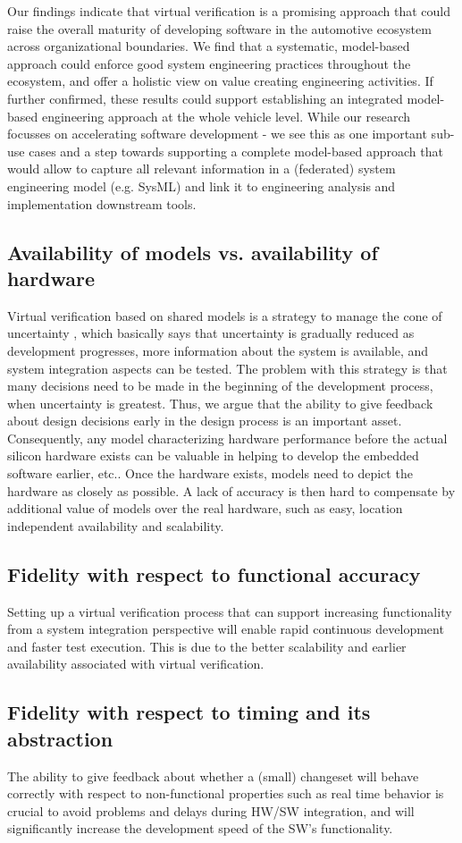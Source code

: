Our findings indicate that virtual verification is a promising approach that could raise the overall maturity of developing software in the automotive ecosystem across organizational boundaries. We find that a systematic, model-based approach could enforce good system engineering practices throughout the ecosystem, and offer a holistic view on value creating engineering activities. If further confirmed, these results could support establishing an integrated model-based engineering approach at the whole vehicle level. While our research focusses on accelerating software development - we see this as one important sub-use cases and a step towards supporting a complete model-based approach that would allow to capture all relevant information in a (federated) system engineering model (e.g. SysML) and link it to engineering analysis and implementation downstream tools.

\subsection{Availability of models vs. availability of hardware}
Virtual verification based on shared models is a strategy to manage the cone of uncertainty \cite{Boehm1981}, which basically says that uncertainty is gradually reduced as development progresses, more information about the system is available, and system integration aspects can be tested. The problem with this strategy is that many decisions need to be made in the beginning of the development process, when uncertainty is greatest. Thus, we argue that the ability to give feedback about design decisions early in the design process is an important asset. Consequently, any model characterizing hardware performance before the actual silicon hardware exists can be valuable in helping to develop the embedded software earlier, etc.. Once the hardware exists, models need to depict the hardware as closely as possible. A lack of accuracy is then hard to compensate by additional value of models over the real hardware, such as easy, location independent availability and scalability.

\subsection{Fidelity with respect to functional accuracy}
Setting up a virtual verification process  that can support increasing functionality from a system integration perspective will enable rapid continuous development and faster test execution. This is due to the better scalability and earlier availability associated with virtual verification.

\subsection{Fidelity with respect to timing and its abstraction}
The ability to give feedback about whether a (small) changeset will behave correctly with respect to non-functional properties such as real time behavior is crucial to avoid problems and delays during HW/SW integration, and will significantly increase the development speed of the SW's functionality.
